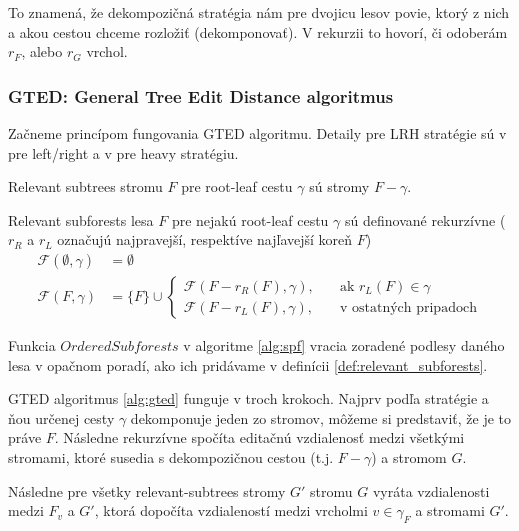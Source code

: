 To znamená, že dekompozičná stratégia nám pre dvojicu lesov povie,
ktorý z nich a akou cestou chceme rozložiť (dekomponovať).
V rekurzii to hovorí, či odoberám $r_{F}$, alebo $r_{G}$ vrchol.




\subsubsection{GTED: General Tree Edit Distance algoritmus}

Začneme princípom fungovania GTED algoritmu. Detaily pre LRH stratégie sú
v \citet{ZHANGSHASHA} pre left/right a v \citet{DMRW} pre heavy stratégiu.

\begin{definice}
  \label{def:relevant_subforests}
	Relevant subtrees stromu $F$ pre root-leaf cestu $\gamma$ sú stromy $F - \gamma$.

	Relevant subforests lesa $F$ pre nejakú root-leaf cestu $\gamma$ sú definované rekurzívne
  ($r_{R}$ a $r_{L}$ označujú najpravejší, respektíve najľavejší koreň $F$)
	\begin{align*}
    \mathcal{F}(\emptyset, \gamma) &= \emptyset
		\\
		\mathcal{F}(F, \gamma) &= \{F\} \cup
		\begin{cases}
      \mathcal{F}(F - r_{R}(F), \gamma), \quad{} &\text{ak $r_{L}(F) \in \gamma$}
			\\
      \mathcal{F}(F - r_{L}(F), \gamma), &\text{v ostatných pripadoch}
		\end{cases}
	\end{align*}
\end{definice}



\begin{pozn}
  Funkcia $OrderedSubforests$ v algoritme \ref{alg:spf} vracia zoradené podlesy daného lesa
  v opačnom poradí, ako ich pridávame v definícii \ref{def:relevant_subforests}.
\end{pozn}

GTED algoritmus \ref{alg:gted} funguje v troch krokoch.
Najprv podľa stratégie a ňou určenej cesty $\gamma$ dekomponuje jeden zo stromov,
môžeme si predstaviť, že je to práve $F$. Následne rekurzívne spočíta editačnú vzdialenosť
medzi všetkými stromami, ktoré susedia s dekompozičnou cestou (t.j. $F - \gamma$) a stromom $G$.

Následne pre všetky relevant-subtrees stromy $G'$ stromu $G$ vyráta vzdialenosti medzi $F_{v}$
a $G'$, ktorá dopočíta vzdialeností medzi vrcholmi $v \in \gamma_{F}$ a stromami $G'$.

